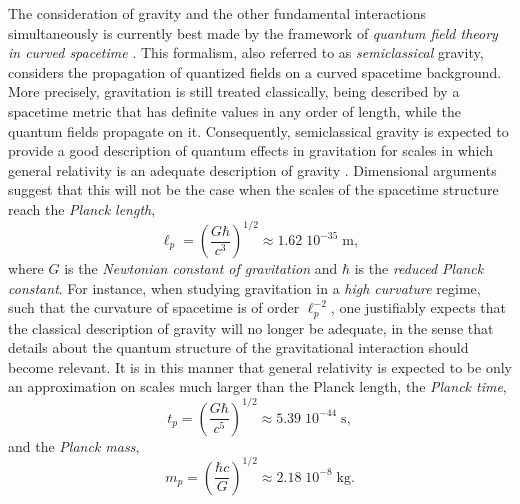 \documentclass[
12pt,		%
openright,	%
twoside,  %
a4paper,			%
chapter=TITLE,		%
english,			%
french,				%
spanish,			%
brazil				%
]{USPSC-classe/USPSC}
\begin{document}
The consideration of gravity and the other fundamental interactions simultaneously is currently best made by the framework of \textit{quantum field theory in curved spacetime} \cite{Parker1968, Parker1969, Parker2009, Wald1994, Birrell1984, Fulling1989}. This formalism, also referred to as \textit{semiclassical} gravity, considers the propagation of quantized fields on a curved spacetime background. More precisely, gravitation is still treated classically, being described by a spacetime metric that has definite values in any order of length, while the quantum fields propagate on it. Consequently, semiclassical gravity is expected to provide a good description of quantum effects in gravitation for scales in which general relativity is an adequate description of gravity \cite{Wald1984}. Dimensional arguments \cite{Misner1973} suggest that this will not be the case when the scales of the spacetime structure reach the \textit{Planck length},
\begin{equation}\label{planck} \ell_p=\left(\frac{G\hbar}{c^3}\right)^{1/2}\approx 1.62\;10^{-35}\;\text{m},\end{equation}
where $G$ is the \textit{Newtonian constant of gravitation} and $\hbar$ is the \textit{reduced Planck constant}. For instance, when studying gravitation in a \textit{high curvature} regime, such that the curvature of spacetime is of order $\ell_p^{-2}$, one justifiably expects that the classical description of gravity will no longer be adequate, in the sense that details about the quantum structure of the gravitational interaction should become relevant. It is in this manner that general relativity is expected to be only an approximation on scales much larger than the Planck length, the \textit{Planck time},
\begin{equation}t_p=\left(\frac{G\hbar}{c^5}\right)^{1/2}\approx 5.39\;10^{-44}\;\text{s},\end{equation}
and the \textit{Planck mass},
\begin{equation} m_p=\left(\frac{\hbar c}{G}\right)^{1/2}\approx 2.18\;10^{-8}\;\text{kg}.\end{equation}
\end{document}
